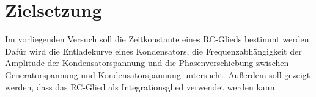 \section{Zielsetzung}
\label{sec:Zielsetzung}
Im vorliegenden Versuch soll die Zeitkonstante eines RC-Glieds bestimmt werden. Dafür wird die Entladekurve eines Kondensators, die Frequenzabhängigkeit der Amplitude der Kondensatorspannung und die Phasenverschiebung zwischen Generatorspannung und Kondensatorspannung untersucht. Außerdem soll gezeigt werden, dass das RC-Glied als Integrationsglied verwendet werden kann.

